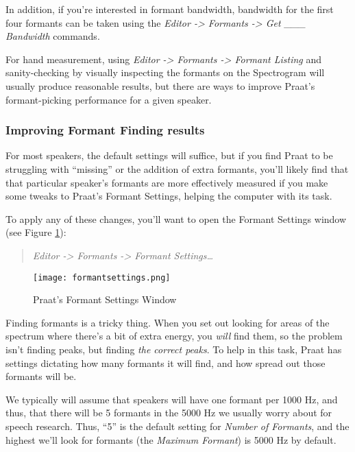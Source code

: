 In addition, if you're interested in formant bandwidth, bandwidth for
the first four formants can be taken using the \emph{Editor
-\textgreater{} Formants -\textgreater{} Get \_\_\_ Bandwidth} commands.

For hand measurement, using \emph{Editor -\textgreater{} Formants
-\textgreater{} Formant Listing} and sanity-checking by visually
inspecting the formants on the Spectrogram will usually produce
reasonable results, but there are ways to improve Praat's
formant-picking performance for a given speaker.

\hypertarget{improving-formant-finding-results}{%
\subsubsection{Improving Formant Finding
results}\label{improving-formant-finding-results}}

For most speakers, the default settings will suffice, but if you find
Praat to be struggling with ``missing'' or the addition of extra
formants, you'll likely find that that particular speaker's formants are
more effectively measured if you make some tweaks to Praat's Formant
Settings, helping the computer with its task.

To apply any of these changes, you'll want to open the Formant Settings
window (see Figure \ref{formantsettings}):

\begin{quote}
\emph{Editor -\textgreater{} Formants -\textgreater{} Formant
Settings\ldots{}}
\end{quote}

\begin{figure}
  \centerline{
    \mbox{\texttt{[image: formantsettings.png]}}
  }
  \caption{Praat's Formant Settings Window \label{formantsettings}}

  \end{figure}

Finding formants is a tricky thing. When you set out looking for areas
of the spectrum where there's a bit of extra energy, you \emph{will}
find them, so the problem isn't finding peaks, but finding \emph{the
correct peaks}. To help in this task, Praat has settings dictating how
many formants it will find, and how spread out those formants will be.

We typically will assume that speakers will have one formant per 1000
Hz, and thus, that there will be 5 formants in the 5000 Hz we usually
worry about for speech research. Thus, ``5'' is the default setting for
\emph{Number of Formants}, and the highest we'll look for formants (the
\emph{Maximum Formant}) is 5000 Hz by default.

